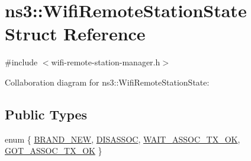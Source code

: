 \hypertarget{structns3_1_1WifiRemoteStationState}{}\section{ns3\+:\+:Wifi\+Remote\+Station\+State Struct Reference}
\label{structns3_1_1WifiRemoteStationState}


{\ttfamily \#include $<$wifi-\/remote-\/station-\/manager.\+h$>$}



Collaboration diagram for ns3\+:\+:Wifi\+Remote\+Station\+State\+:
\subsection*{Public Types}
\begin{DoxyCompactItemize}
\item 
enum \{ \hyperlink{structns3_1_1WifiRemoteStationState_a40148a54611283f922e2ef0bc0595338afbc30ce0ce2a16961521cc6573780fcd}{B\+R\+A\+N\+D\+\_\+\+N\+EW}, 
\hyperlink{structns3_1_1WifiRemoteStationState_a40148a54611283f922e2ef0bc0595338a0d3eeb4cfddcc249193ec8d289b3bbc4}{D\+I\+S\+A\+S\+S\+OC}, 
\hyperlink{structns3_1_1WifiRemoteStationState_a40148a54611283f922e2ef0bc0595338ab037c249ee13cc956c99c2b5c02458a2}{W\+A\+I\+T\+\_\+\+A\+S\+S\+O\+C\+\_\+\+T\+X\+\_\+\+OK}, 
\hyperlink{structns3_1_1WifiRemoteStationState_a40148a54611283f922e2ef0bc0595338a2bdcbf9461729e087ce243047f538e39}{G\+O\+T\+\_\+\+A\+S\+S\+O\+C\+\_\+\+T\+X\+\_\+\+OK}
 \}
\end{DoxyCompactItemize}
